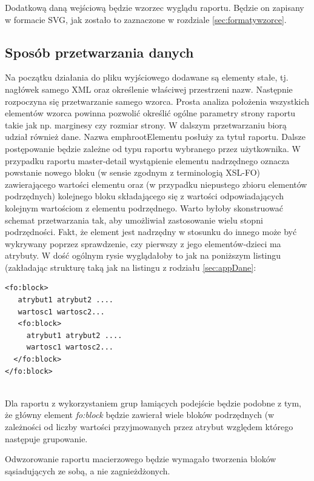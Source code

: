 \documentclass[11pt,a4paper]{article}
\begin{document}
Dodatkową daną wejściową będzie wzorzec wyglądu raportu. Będzie on zapisany w formacie SVG, jak zostało to zaznaczone w rozdziale \ref{sec:formatywzorce}.

\subsection{Sposób przetwarzania danych}\label{sec:appPrzetwarzanie}
Na początku działania do pliku wyjściowego dodawane są elementy stałe, tj. nagłówek samego XML oraz określenie właściwej przestrzeni nazw. Następnie rozpoczyna się przetwarzanie samego wzorca. Prosta analiza położenia wszystkich elementów wzorca powinna pozwolić określić ogólne parametry strony raportu takie jak np. marginesy czy rozmiar strony. W dalszym przetwarzaniu biorą udział również dane. Nazwa emph{rootElementu} posłuży za tytuł raportu. Dalsze postępowanie będzie zależne od typu raportu wybranego przez użytkownika. W przypadku raportu master-detail wystąpienie elementu nadrzędnego oznacza powstanie nowego bloku (w sensie zgodnym z terminologią XSL-FO) zawierającego wartości elementu oraz (w przypadku niepustego zbioru elementów podrzędnych) kolejnego bloku składającego się z wartości odpowiadających kolejnym wartościom z elementu podrzędnego. Warto byłoby skonstruować schemat przetwarzania tak, aby umożliwiał zastosowanie wielu stopni podrzędności. Fakt, że element jest nadrzędny w stosunku do innego może być wykrywany poprzez sprawdzenie, czy pierwszy z jego elementów-dzieci ma atrybuty. W dość ogólnym rysie wyglądałoby to jak na poniższym listingu (zakładając strukturę taką jak na listingu z rodziału \ref{sec:appDane}:\\

\lstset{language=XML}
\begin{lstlisting}[frame=single,caption=Przykładowa struktura pliku XSL-FO,label=strukturaXSL]
<fo:block>
   atrybut1 atrybut2 ....
   wartosc1 wartosc2...
   <fo:block>
     atrybut1 atrybut2 ....
     wartosc1 wartosc2...	
  </fo:block>
</fo:block>


\end{lstlisting}

Dla raportu z wykorzystaniem grup łamiących podejście będzie podobne z tym, że główny element \emph{fo:block} będzie zawierał wiele bloków podrzędnych (w zależności od liczby wartości przyjmowanych przez atrybut względem którego następuje grupowanie.

Odwzorowanie raportu macierzowego będzie wymagało tworzenia bloków sąsiadujących ze sobą, a nie zagnieżdżonych.
\end{document}
